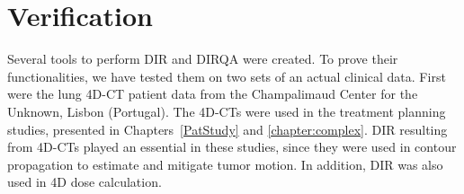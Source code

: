 % 
% 
% 
% 
% 


\newpage
\section{Verification}
\label{Verification}

Several tools to perform DIR and DIRQA were created. To prove their functionalities, we have tested them on two sets of an actual clinical data. 
First were the lung 4D-CT patient data from the Champalimaud Center for the Unknown, Lisbon (Portugal). The 4D-CTs were used in the treatment planning studies, presented in Chapters~\ref{PatStudy} and \ref{chapter:complex}. 
DIR resulting from 4D-CTs played an essential in these studies, since they were used in contour propagation to estimate and mitigate tumor motion. In addition, DIR was also used in 4D dose calculation.

